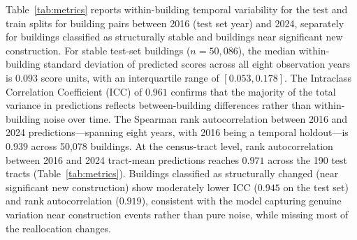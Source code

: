 \documentclass[conference]{IEEEtran}
\begin{document}
Table~\ref{tab:metrics} reports within-building temporal variability for the test and train splits for building pairs between 2016 (test set year) and 2024, separately for buildings classified as structurally stable and buildings near significant new construction. For stable test-set buildings ($n = 50{,}086$), the median within-building standard deviation of predicted scores across all eight observation years is $0.093$ score units, with an interquartile range of $[0.053, 0.178]$. The Intraclass Correlation Coefficient (ICC) of $0.961$ confirms that the majority of the total variance in predictions reflects between-building differences rather than within-building noise over time. The Spearman rank autocorrelation between 2016 and 2024 predictions---spanning eight years, with 2016 being a temporal holdout---is $0.939$ across 50,078 buildings. At the census-tract level, rank autocorrelation between 2016 and 2024 tract-mean predictions reaches $0.971$ across the 190 test tracts (Table~\ref{tab:metrics}). Buildings classified as structurally changed (near significant new construction) show moderately lower ICC ($0.945$ on the test set) and rank autocorrelation ($0.919$), consistent with the model capturing genuine variation near construction events rather than pure noise, while missing most of the reallocation changes.



\end{document}

